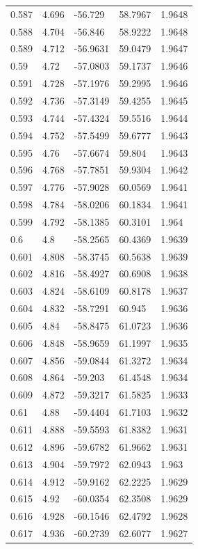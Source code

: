 \begin{tabular}{lllll}
0.587 & 4.696 & -56.729 & 58.7967 & 1.9648 \\
0.588 & 4.704 & -56.846 & 58.9222 & 1.9648 \\
0.589 & 4.712 & -56.9631 & 59.0479 & 1.9647 \\
0.59 & 4.72 & -57.0803 & 59.1737 & 1.9646 \\
0.591 & 4.728 & -57.1976 & 59.2995 & 1.9646 \\
0.592 & 4.736 & -57.3149 & 59.4255 & 1.9645 \\
0.593 & 4.744 & -57.4324 & 59.5516 & 1.9644 \\
0.594 & 4.752 & -57.5499 & 59.6777 & 1.9643 \\
0.595 & 4.76 & -57.6674 & 59.804 & 1.9643 \\
0.596 & 4.768 & -57.7851 & 59.9304 & 1.9642 \\
0.597 & 4.776 & -57.9028 & 60.0569 & 1.9641 \\
0.598 & 4.784 & -58.0206 & 60.1834 & 1.9641 \\
0.599 & 4.792 & -58.1385 & 60.3101 & 1.964 \\
0.6 & 4.8 & -58.2565 & 60.4369 & 1.9639 \\
0.601 & 4.808 & -58.3745 & 60.5638 & 1.9639 \\
0.602 & 4.816 & -58.4927 & 60.6908 & 1.9638 \\
0.603 & 4.824 & -58.6109 & 60.8178 & 1.9637 \\
0.604 & 4.832 & -58.7291 & 60.945 & 1.9636 \\
0.605 & 4.84 & -58.8475 & 61.0723 & 1.9636 \\
0.606 & 4.848 & -58.9659 & 61.1997 & 1.9635 \\
0.607 & 4.856 & -59.0844 & 61.3272 & 1.9634 \\
0.608 & 4.864 & -59.203 & 61.4548 & 1.9634 \\
0.609 & 4.872 & -59.3217 & 61.5825 & 1.9633 \\
0.61 & 4.88 & -59.4404 & 61.7103 & 1.9632 \\
0.611 & 4.888 & -59.5593 & 61.8382 & 1.9631 \\
0.612 & 4.896 & -59.6782 & 61.9662 & 1.9631 \\
0.613 & 4.904 & -59.7972 & 62.0943 & 1.963 \\
0.614 & 4.912 & -59.9162 & 62.2225 & 1.9629 \\
0.615 & 4.92 & -60.0354 & 62.3508 & 1.9629 \\
0.616 & 4.928 & -60.1546 & 62.4792 & 1.9628 \\
0.617 & 4.936 & -60.2739 & 62.6077 & 1.9627 \\

\end{tabular}
